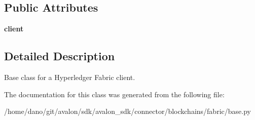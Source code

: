 \subsection*{Public Attributes}
\begin{DoxyCompactItemize}
\item 
\mbox{\label{classavalon__sdk_1_1connector_1_1blockchains_1_1fabric_1_1base_1_1ClientBase_a95b38b28ce475452a07261b4aa370905}} 
{\bfseries client}
\end{DoxyCompactItemize}


\subsection{Detailed Description}
\begin{DoxyVerb}Base class for a Hyperledger Fabric client.\end{DoxyVerb}
 

The documentation for this class was generated from the following file\+:\begin{DoxyCompactItemize}
\item 
/home/dano/git/avalon/sdk/avalon\+\_\+sdk/connector/blockchains/fabric/base.\+py\end{DoxyCompactItemize}
